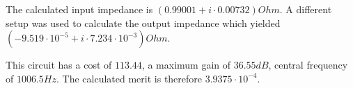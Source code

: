 \par

The calculated input impedance is $(0.99001+i\cdot 0.00732) Ohm$.
A different setup was used to calculate the output impedance which yielded $(-9.519\cdot 10^{-5}+i\cdot 7.234\cdot 10^{-3}) Ohm$.

This circuit has a cost of $113.44$, a maximum gain of $36.55 dB$, central frequency of $1006.5 Hz$.
The calculated merit is therefore $3.9375\cdot 10^{-4}$.
